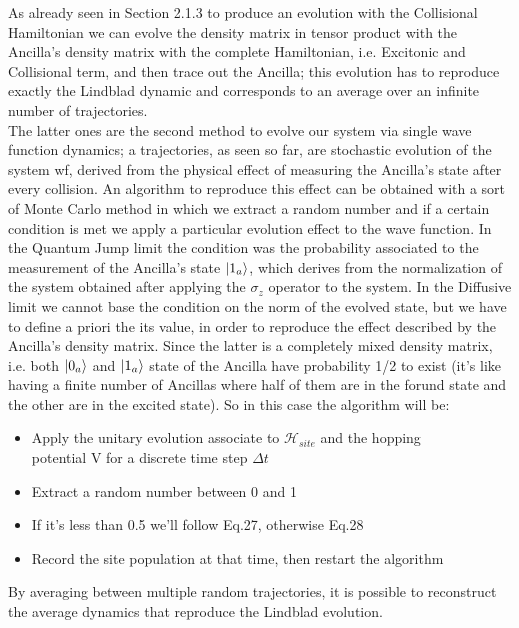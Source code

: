 \documentclass[a4paper,12pt]{article}
\begin{document}
	As already seen in Section 2.1.3 to produce an evolution with the Collisional Hamiltonian we can evolve the density matrix in tensor product with the Ancilla's density matrix with the complete Hamiltonian, i.e. Excitonic and Collisional term, and then trace out the Ancilla; this evolution has to reproduce exactly the Lindblad dynamic and corresponds to an average over an infinite number of trajectories. \\
	The latter ones are the second method to evolve our system via single wave function dynamics; a trajectories, as seen so far, are stochastic evolution of the system wf, derived from the physical effect of measuring the Ancilla's state after every collision. An algorithm to reproduce this effect can be obtained with a sort of Monte Carlo method in which we extract a random number and if a certain condition is met we apply a particular evolution effect to the wave function. In the Quantum Jump limit the condition was the probability associated to the measurement of the Ancilla's state $ \ket{1_a} $, which derives from the normalization of the system obtained after applying the $ \sigma_z $ operator to the system. In the Diffusive limit we cannot base the condition on the norm of the evolved state, but we have to define a priori the its value, in order to reproduce the effect described by the Ancilla's density matrix. Since the latter is a completely mixed density matrix, i.e. both $ \ket{0_a} $ and $ \ket{1_a} $ state of the Ancilla have probability 1/2 to exist (it's like having a finite number of Ancillas where half of them are in the forund state and the other are in the excited state). So in this case the algorithm will be:
	
	\begin{itemize}
		\item [1.] Apply the unitary evolution associate to $ \mathcal{H}_{site} $ and the hopping \\ potential V for a discrete time step $ \Delta t $ 
		\item [2.] Extract a random number between 0 and 1
		\item [3.] If it's less than 0.5 we'll follow Eq.27, otherwise Eq.28
		\item [4.] Record the site population at that time, then restart the algorithm
	\end{itemize} 
	
	By averaging between multiple random trajectories, it is possible to reconstruct the average dynamics that reproduce the Lindblad evolution.
	
\end{document}
